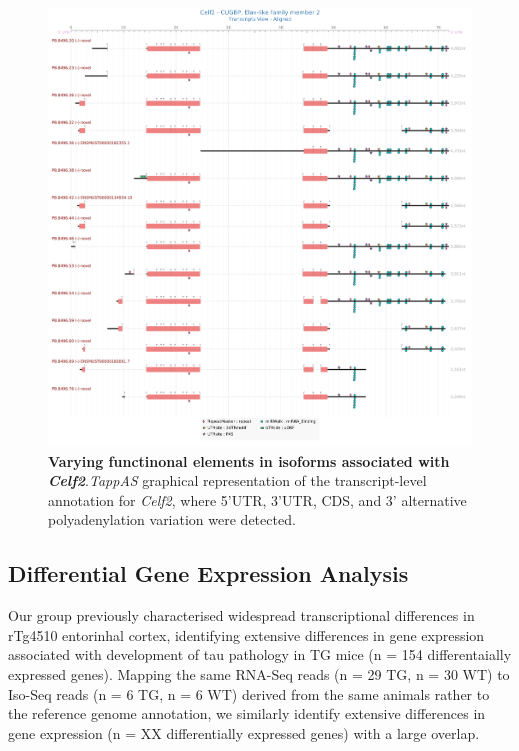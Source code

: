 \begin{figure}[!htp]
	\centering
	\includegraphics[scale = 0.3]{Figures/tappAS_Celf2.png}
	\captionsetup{width=0.95\textwidth}
	\caption[Varying functinonal elements in isoforms associated with \textit{Celf2}]%
	{\textbf{Varying functinonal elements in isoforms associated with \textit{Celf2}}.\textit{TappAS} graphical representation of the transcript-level annotation for \textit{Celf2}, where 5'UTR, 3'UTR, CDS, and 3' alternative polyadenylation variation were detected.}   
	\label{fig:Celf}
\end{figure}	



\clearpage 
\subsection{Differential Gene Expression Analysis}
Our group previously characterised widespread transcriptional differences in rTg4510 entorinhal cortex, identifying extensive differences in gene expression associated with development of tau pathology in TG mice (n = 154 differentaially expressed genes)\cite{Castanho2020}. Mapping the same RNA-Seq reads (n = 29 TG, n = 30 WT) to Iso-Seq reads (n = 6 TG, n = 6 WT) derived from the same animals rather to the reference genome annotation, we similarly identify extensive differences in gene expression (n = XX differentially expressed genes) with a large overlap. 

